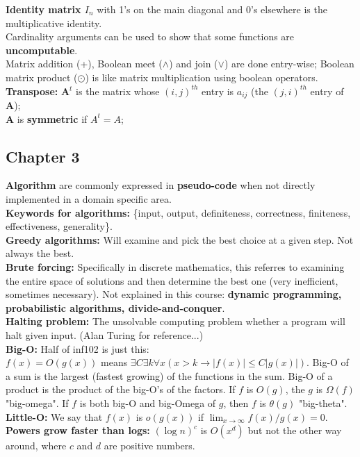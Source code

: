\documentclass[12pt]{article}
\begin{document}
\textbf{Identity matrix $I_n$} with 1's on the main diagonal and 0's elsewhere is the multiplicative identity. \\
Cardinality arguments can be used to show that some functions are \textbf{uncomputable}. \\
Matrix addition (+), Boolean meet ($\wedge$) and join ($\vee$) are done entry-wise; Boolean matrix product ($\odot$) is like matrix multiplication using boolean operators. \\
\textbf{Transpose:} \textbf{A}$^t$ is the matrix whose $(i,j)^{th}$ entry is $a_{ij}$ (the $(j,i)^{th}$ entry of \textbf{A}); \\
\textbf{A} is \textbf{symmetric} if \textbf{$A^t=A$};
\newpage
\subsection{Chapter 3}
\textbf{Algorithm} are commonly expressed in \textbf{pseudo-code} when not directly implemented in a domain specific area. \\
\textbf{Keywords for algorithms:} \{input, output, definiteness, correctness, finiteness, effectiveness, generality\}. \\
\textbf{Greedy algorithms:} Will examine and pick the best choice at a given step. Not always the best. \\
\textbf{Brute forcing:} Specifically in discrete mathematics, this referres to examining the entire space of solutions and then determine the best one (very inefficient, sometimes necessary). Not explained in this course: \textbf{dynamic programming, probabilistic algorithms, divide-and-conquer}. \\
\textbf{Halting problem:} The unsolvable computing problem whether a program will halt given input. (Alan Turing for reference...) \\
\textbf{Big-O:} Half of inf102 is just this: \\
$f(x) = O(g(x))$ means $\exists C\exists k \forall x(x > k \rightarrow |f(x)| \leq C|g(x)|)$. Big-O of a sum is the largest (fastest growing) of the functions in the sum. Big-O of a product is the product of the big-O's of the factors. If $f$ is $O(g)$, the $g$ is $\Omega (f)$ "big-omega". If $f$ is both big-O and big-Omega of $g$, then $f$ is $\theta (g)$ "big-theta". \\
\textbf{Little-O:} We say that $f(x)$ is $o(g(x))$ if $\lim_{x\rightarrow \infty}f(x)/g(x) =0$.\\
\textbf{Powers grow faster than logs:} $(\log n)^c$ is $O(x^d)$ but not the other way around, where $c$ and $d$ are positive numbers. \\
\end{document}
